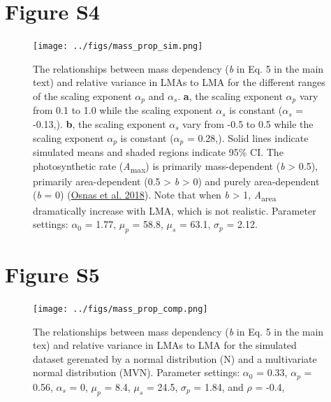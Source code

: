 \documentclass[
  12pt,
  letterpaper,
  DIV=11,
  numbers=noendperiod]{scrartcl}
\begin{document}
\newpage

\hypertarget{figure-s4}{%
\section{Figure S4}\label{figure-s4}}

\begin{figure}

{\centering \texttt{[image: ../figs/mass\_prop\_sim.png]}

}

\caption{\label{fig-mass_prop_sim}The relationships between mass
dependency (\emph{b} in Eq. 5 in the main text) and relative variance in
LMAs to LMA for the different ranges of the scaling exponent
\(\alpha_p\) and \(\alpha_s\). \textbf{a}, the scaling exponent
\(\alpha_p\) vary from 0.1 to 1.0 while the scaling exponent
\(\alpha_s\) is constant (\(\alpha_s\) = -0.13,). \textbf{b}, the
scaling exponent \(\alpha_s\) vary from -0.5 to 0.5 while the scaling
exponent \(\alpha_p\) is constant (\(\alpha_p\) = 0.28,). Solid lines
indicate simulated means and shaded regions indicate 95\% CI. The
photosynthetic rate (\emph{A}\textsubscript{max}) is primarily
mass-dependent (\emph{b} \textgreater{} 0.5), primarily area-dependent
(0.5 \textgreater{} \emph{b} \textgreater{} 0) and purely area-dependent
(\emph{b} = 0) (\protect\hyperlink{ref-Osnas2018}{Osnas et al. 2018}).
Note that when \emph{b} \textgreater{} 1, \emph{A}\textsubscript{area}
dramatically increase with LMA, which is not realistic. Parameter
settings: \(\alpha_0\) = 1.77, \(\mu_p\) = 58.8, \(\mu_s\) = 63.1,
\(\sigma_p\) = 2.12.}

\end{figure}

\newpage

\hypertarget{figure-s5}{%
\section{Figure S5}\label{figure-s5}}

\begin{figure}

{\centering \texttt{[image: ../figs/mass\_prop\_comp.png]}

}

\caption{\label{fig-mass_prop_comp}The relationships between mass
dependency (\emph{b} in Eq. 5 in the main tex) and relative variance in
LMAs to LMA for the simulated dataset gerenated by a normal distribution
(N) and a multivariate normal distribution (MVN). Parameter settings:
\(\alpha_0\) = 0.33, \(\alpha_p\) = 0.56, \(\alpha_s\) = 0, \(\mu_p\) =
8.4, \(\mu_s\) = 24.5, \(\sigma_p\) = 1.84, and \(\rho\) = -0.4,}

\end{figure}
\end{document}
